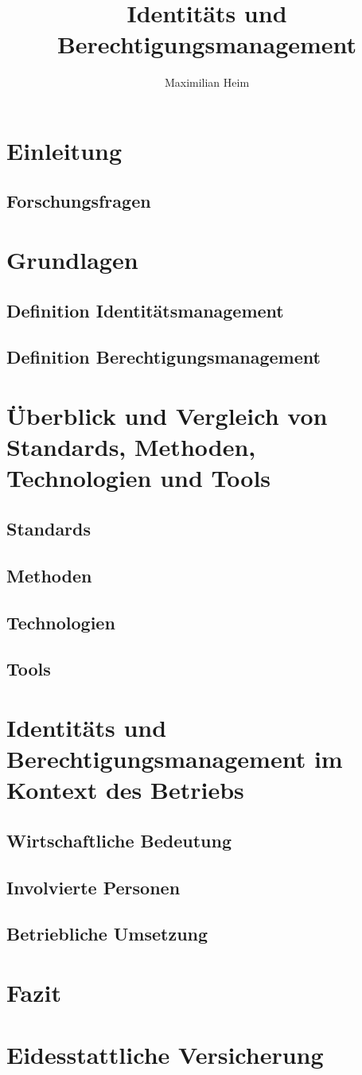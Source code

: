\documentclass[10pt]{article}
\author{Maximilian Heim}
\title{Identitäts und Berechtigungsmanagement}
\begin{document}
\maketitle
\newpage
\tableofcontents
\newpage
\section{Einleitung}
\subsection{Forschungsfragen}
\section{Grundlagen}
\subsection{Definition Identitätsmanagement}
\subsection{Definition Berechtigungsmanagement}
\section{Überblick und Vergleich von Standards, Methoden, Technologien und Tools}
\subsection{Standards}
\subsection{Methoden}
\subsection{Technologien}
\subsection{Tools}
\section{Identitäts und Berechtigungsmanagement im Kontext des Betriebs}
\subsection{Wirtschaftliche Bedeutung}
\subsection{Involvierte Personen}
\subsection{Betriebliche Umsetzung}
\section{Fazit}
\section{Eidesstattliche Versicherung}
\end{document}
